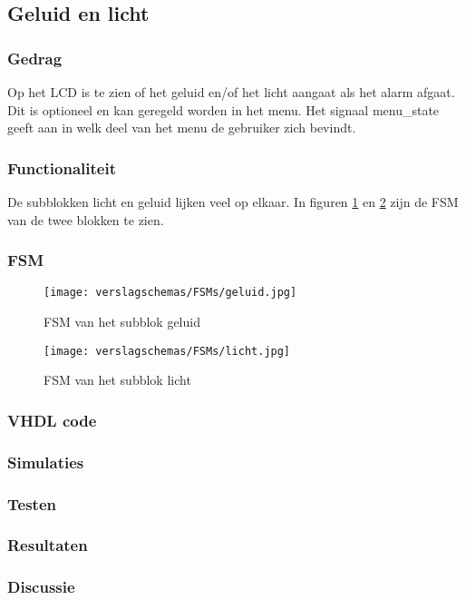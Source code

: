 \subsection{Geluid en licht}

\subsubsection{Gedrag}
Op het LCD is te zien of het geluid en/of het licht aangaat als het alarm afgaat. Dit is optioneel en kan geregeld worden in het menu. Het signaal menu\_state geeft aan in welk deel van het menu de gebruiker zich bevindt.

\subsubsection{Functionaliteit}
De subblokken licht en geluid lijken veel op elkaar. In figuren \ref{fig:FSMgeluid} en \ref{fig:FSMlicht} zijn de FSM van de twee blokken te zien.

\subsubsection{FSM}

\begin{figure}[h!]
\texttt{[image: verslagschemas/FSMs/geluid.jpg]}
\caption{FSM van het subblok geluid}
\label{fig:FSMgeluid}
\end{figure}

\begin{figure}[h!]
\texttt{[image: verslagschemas/FSMs/licht.jpg]}
\caption{FSM van het subblok licht}
\label{fig:FSMlicht}
\end{figure}

\subsubsection{VHDL code}

\subsubsection{Simulaties}

\subsubsection{Testen}

\subsubsection{Resultaten}

\subsubsection{Discussie}